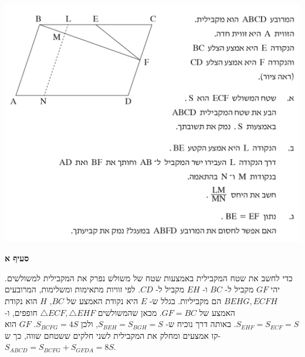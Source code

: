 \documentclass[12pt,a4paper]{article}
\begin{document}
\begin{center}
\includegraphics[width=.8\textwidth]{summer-2017b-4}
\end{center}
\vspace{-8mm}
\textbf{סעיף א}

כדי לחשב את שטח המקבילית באמצעות שטח של משולש נפרק את המקבילית למשולשים. יהי 
$GF$
מקביל ל-%
$BC$
ו-%
$EH$
מקביל ל-%
$CD$.
לפי זוויות מתאימות ומשלימות, המרובעים 
$BEHG,ECFH$
הם מקביליות. בגלל ש-%
$E$
היא נקודת האמצע של
$BC$,
$H$
הוא נקודת האמצע של
$GF=BC$.
מכאן שהמשולשים 
$\triangle ECF,\triangle EHF$
חופפים, ו-%
$S_{EHF}=S_{ECF}=S$.
באותה דרך נוכיח ש-%
$S_{BEH}=S_{BGH}=S$,
ולכן
$S_{BCFG}=4S$.
$GF$
הוא קו אמצעים ומחלק את המקבילית לשני חלקים ששטחם שווה, כך ש-%
$S_{ABCD}=S_{BCFG}+S_{GFDA}=8S$.
\end{document}
